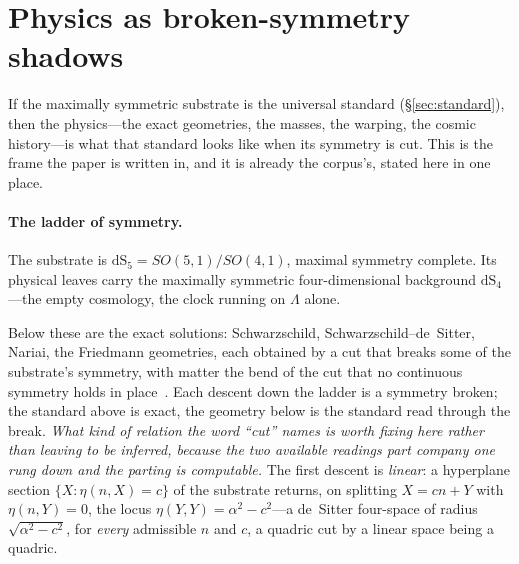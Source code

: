 \documentclass[11pt,a4paper]{article}
\theoremstyle{definition}
\begin{document}
\section{Physics as broken-symmetry shadows}\label{sec:shadows}

If the maximally symmetric substrate is the universal standard
(\S\ref{sec:standard}), then the physics---the exact geometries, the
masses, the warping, the cosmic history---is what that standard looks like
when its symmetry is cut. This is the frame the paper is written in, and it
is already the corpus's, stated here in one place.

\paragraph{The ladder of symmetry.} The substrate is
$\mathrm{dS}_5=SO(5,1)/SO(4,1)$, maximal symmetry complete. Its physical
leaves carry the maximally symmetric four-dimensional background
$\mathrm{dS}_4$---the empty cosmology, the clock running on $\Lambda$ alone.


Below these are the exact solutions: Schwarzschild, Schwarzschild--de~Sitter,
Nariai, the Friedmann geometries, each obtained by a cut that breaks some of
the substrate's symmetry, with matter the bend of the cut that no continuous
symmetry holds in
place~\cite{JanzenSlicing,JanzenOperator,JanzenRange}. Each descent down the
ladder is a symmetry broken; the standard above is exact, the geometry below
is the standard read through the break. \emph{What kind of relation the word ``cut'' names is worth
fixing here rather than leaving to be inferred, because the two available readings part company one
rung down and the parting is computable.} The first descent is
\emph{linear}: a hyperplane section $\{X:\eta(n,X)=c\}$ of the substrate returns, on splitting
$X=cn+Y$ with $\eta(n,Y)=0$, the locus $\eta(Y,Y)=\alpha^{2}-c^{2}$---a de~Sitter four-space of radius
$\sqrt{\alpha^{2}-c^{2}}$, for \emph{every} admissible $n$ and $c$, a quadric cut by a linear space being
a quadric. 
\end{document}
